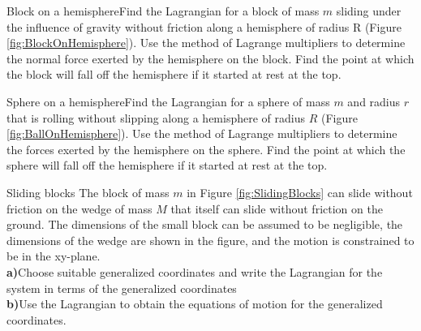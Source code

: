 \begin{problem}{Block on a hemisphere}Find the Lagrangian for a block of mass $m$ sliding under the influence of gravity without friction along a hemisphere of radius R (Figure \ref{fig:BlockOnHemisphere}). Use the method of Lagrange multipliers to determine the normal force exerted by the hemisphere on the block. Find the point at which the block will fall off the hemisphere if it started at rest at the top.
\label{prob_Lagrange_7}
\end{problem}

\begin{problem}{Sphere on a hemisphere}Find the Lagrangian for a sphere of mass $m$ and radius $r$ that is rolling without slipping along a hemisphere of radius $R$ (Figure \ref{fig:BallOnHemisphere}). Use the method of Lagrange multipliers to determine the forces exerted by the hemisphere on the sphere. Find the point at which the sphere will fall off the hemisphere if it started at rest at the top.
\label{prob_Lagrange_8}
\end{problem}

\begin{problem}{Sliding blocks}
The block of mass $m$ in Figure \ref{fig:SlidingBlocks} can slide without friction on the wedge of mass $M$ that itself can slide without friction on the ground. The dimensions of the small block can be assumed to be negligible, the dimensions of the wedge are shown in the figure, and the motion is constrained to be in the xy-plane.
\\
\textbf{a)}Choose suitable generalized coordinates and write the Lagrangian for the system in terms of the generalized coordinates\\
\textbf{b)}Use the Lagrangian to obtain the equations of motion for the generalized coordinates.
\label{prob_Lagrange_9}
\end{problem}

